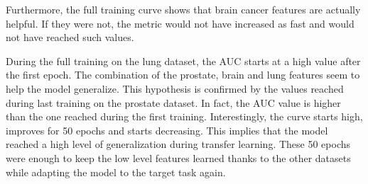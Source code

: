 Furthermore, the full training curve shows that brain cancer features are actually helpful. If they were not, the metric would not have increased as fast and would not have reached such values.

During the full training on the lung dataset, the AUC starts at a high value after the first epoch. The combination of the prostate, brain and lung features seem to help the model generalize. This hypothesis is confirmed by the values reached during last training on the prostate dataset. In fact, the AUC value is higher than the one reached during the first training. Interestingly, the curve starts high, improves for 50 epochs and starts decreasing. This implies that the model reached a high level of generalization during transfer learning. These 50 epochs were enough to keep the low level features learned thanks to the other datasets while adapting the model to the target task again. 

%
%


